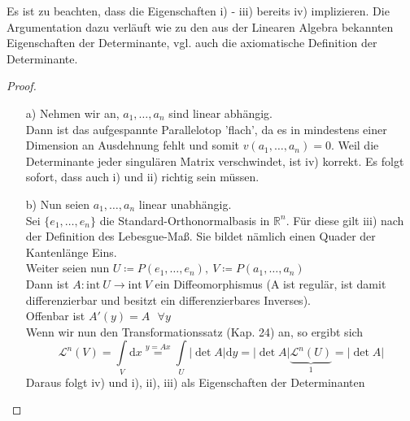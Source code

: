     Es ist zu beachten, dass die Eigenschaften i) - iii) bereits iv) implizieren. Die Argumentation
    dazu verläuft wie zu den aus der Linearen Algebra bekannten Eigenschaften der Determinante, vgl.
    auch die axiomatische Definition der Determinante.
\newpage
\begin{proof}
    \mbox{}
    \begin{enumerate}
        \item[a)] 
            Nehmen wir an, $a_1, \ldots, a_n$ sind linear abhängig. \\
            Dann ist das aufgespannte Parallelotop 'flach', da es in mindestens 
            einer Dimension an Ausdehnung fehlt und somit
            $v(a_1, \ldots, a_n) = 0 $. Weil die Determinante jeder singulären Matrix verschwindet, ist iv) korrekt. Es folgt sofort, dass auch i) und ii) richtig sein müssen.
        \item[b)]
            Nun seien $a_1, \ldots, a_n$ linear unabhängig. \\
            Sei $\lbrace e_1, \ldots, e_n \rbrace$ die Standard-Orthonormalbasis in
            $\mathbb{R}^n $. Für diese gilt iii) nach der Definition des Lebesgue-Maß. Sie bildet nämlich einen Quader der Kantenlänge Eins. \\
            Weiter seien nun $U \coloneqq P(e_1, \ldots, e_n),\
            V \coloneqq P(a_1, \ldots, a_n) $ \\
            Dann ist $A: \mathrm{int}\ U \rightarrow \mathrm{int}\ V $
            ein Diffeomorphismus (A ist regulär, ist damit differenzierbar und
            besitzt ein differenzierbares Inverses). \\
            Offenbar ist $A'(y) = A \ \ \ \forall y $ \\
            Wenn wir nun den Transformationssatz (Kap. 24) an, so ergibt sich
            \begin{equation*}
            	\mathcal{L}^n (V) = \int\limits_V \mathrm{d}x \stackrel{y = Ax}{=}
            	\int\limits_U |\det A| \mathrm{d}y = |\det A| \underbrace{\mathcal{L}^n (U)}_1
           		 = |\det A|
           	\end{equation*}
            Daraus folgt iv) und i), ii), iii) als Eigenschaften
            der Determinanten
    \end{enumerate}
\end{proof}

